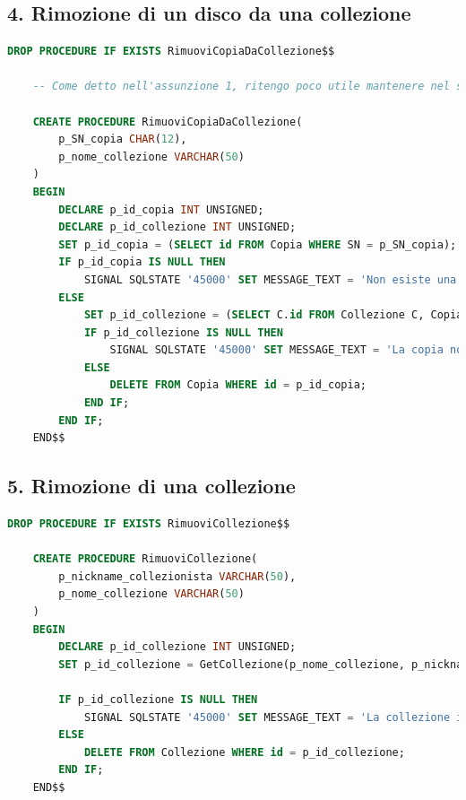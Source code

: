 \documentclass{article}
\begin{document}
\subsection*{4. Rimozione di un disco da una collezione}
\begin{lstlisting}[language=SQL]
    DROP PROCEDURE IF EXISTS RimuoviCopiaDaCollezione$$

    -- Come detto nell'assunzione 1, ritengo poco utile mantenere nel sistema copie senza una collezione. Di conseguenza, rimuovere una copia da una collezione significa rimuoverla dal sistema.
    
    CREATE PROCEDURE RimuoviCopiaDaCollezione(
        p_SN_copia CHAR(12),
        p_nome_collezione VARCHAR(50)
    )
    BEGIN
        DECLARE p_id_copia INT UNSIGNED;
        DECLARE p_id_collezione INT UNSIGNED;
        SET p_id_copia = (SELECT id FROM Copia WHERE SN = p_SN_copia); 
        IF p_id_copia IS NULL THEN 
            SIGNAL SQLSTATE '45000' SET MESSAGE_TEXT = 'Non esiste una copia con questo SN';
        ELSE 
            SET p_id_collezione = (SELECT C.id FROM Collezione C, Copia CP WHERE CP.id = p_id_copia AND C.id = CP.id_collezione AND C.nome = p_nome_collezione);
            IF p_id_collezione IS NULL THEN
                SIGNAL SQLSTATE '45000' SET MESSAGE_TEXT = 'La copia non fa parte della collezione indicata';
            ELSE 
                DELETE FROM Copia WHERE id = p_id_copia;
            END IF;
        END IF;
    END$$
\end{lstlisting}

\subsection*{5. Rimozione di una collezione}
\begin{lstlisting}[language=SQL]
    DROP PROCEDURE IF EXISTS RimuoviCollezione$$

    CREATE PROCEDURE RimuoviCollezione(
        p_nickname_collezionista VARCHAR(50),
        p_nome_collezione VARCHAR(50)
    )
    BEGIN
        DECLARE p_id_collezione INT UNSIGNED;
        SET p_id_collezione = GetCollezione(p_nome_collezione, p_nickname_collezionista);
        
        IF p_id_collezione IS NULL THEN
            SIGNAL SQLSTATE '45000' SET MESSAGE_TEXT = 'La collezione indicata non esiste';
        ELSE
            DELETE FROM Collezione WHERE id = p_id_collezione;
        END IF;
    END$$
    
\end{lstlisting}
\end{document}
